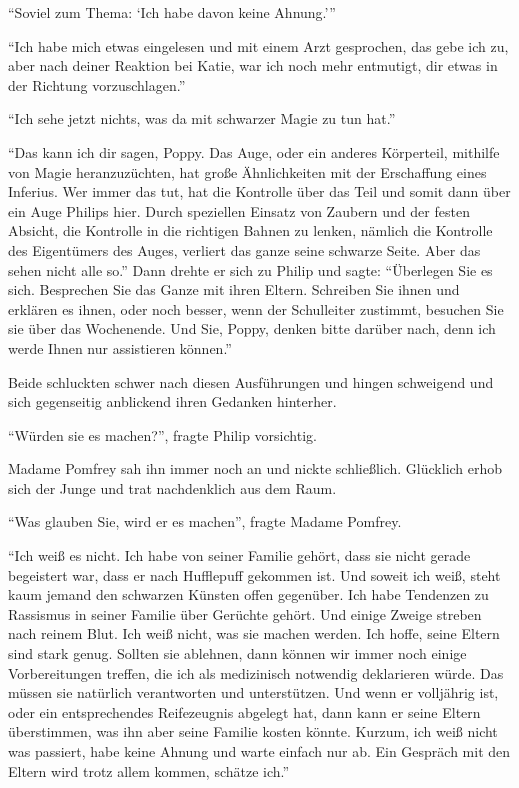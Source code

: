 \enquote{Soviel zum Thema: \enquote{Ich habe davon keine Ahnung.}}

\enquote{Ich habe mich etwas eingelesen und mit einem Arzt gesprochen, das gebe ich zu, aber nach deiner Reaktion bei Katie, war ich noch mehr entmutigt, dir etwas in der Richtung vorzuschlagen.}

\enquote{Ich sehe jetzt nichts, was da mit schwarzer Magie zu tun hat.}

\enquote{Das kann ich dir sagen, Poppy. Das Auge, oder ein anderes Körperteil, mithilfe von Magie heranzuzüchten, hat große Ähnlichkeiten mit der Erschaffung eines Inferius. Wer immer das tut, hat die Kontrolle über das Teil und somit dann über ein Auge Philips hier. Durch speziellen Einsatz von Zaubern und der festen Absicht, die Kontrolle in die richtigen Bahnen zu lenken, nämlich die Kontrolle des Eigentümers des Auges, verliert das ganze seine schwarze Seite. Aber das sehen nicht alle so.} Dann drehte er sich zu Philip und sagte: \enquote{Überlegen Sie es sich. Besprechen Sie das Ganze mit ihren Eltern. Schreiben Sie ihnen und erklären es ihnen, oder noch besser, wenn der Schulleiter zustimmt, besuchen Sie sie über das Wochenende. Und Sie, Poppy, denken bitte darüber nach, denn ich werde Ihnen nur assistieren können.}

Beide schluckten schwer nach diesen Ausführungen und hingen schweigend und sich gegenseitig anblickend ihren Gedanken hinterher.

\enquote{Würden sie es machen?}, fragte Philip vorsichtig.

Madame Pomfrey sah ihn immer noch an und nickte schließlich. Glücklich erhob sich der Junge und trat nachdenklich aus dem Raum.

\enquote{Was glauben Sie, wird er es machen}, fragte Madame Pomfrey.

\enquote{Ich weiß es nicht. Ich habe von seiner Familie gehört, dass sie nicht gerade begeistert war, dass er nach Hufflepuff gekommen ist. Und soweit ich weiß, steht kaum jemand den schwarzen Künsten offen gegenüber. Ich habe Tendenzen zu Rassismus in seiner Familie über Gerüchte gehört. Und einige Zweige streben nach reinem Blut. Ich weiß nicht, was sie machen werden. Ich hoffe, seine Eltern sind stark genug. Sollten sie ablehnen, dann können wir immer noch einige Vorbereitungen treffen, die ich als medizinisch notwendig deklarieren würde. Das müssen sie natürlich verantworten und unterstützen. Und wenn er volljährig ist, oder ein entsprechendes Reifezeugnis abgelegt hat, dann kann er seine Eltern überstimmen, was ihn aber seine Familie kosten könnte. Kurzum, ich weiß nicht was passiert, habe keine Ahnung und warte einfach nur ab. Ein Gespräch mit den Eltern wird trotz allem kommen, schätze ich.}


